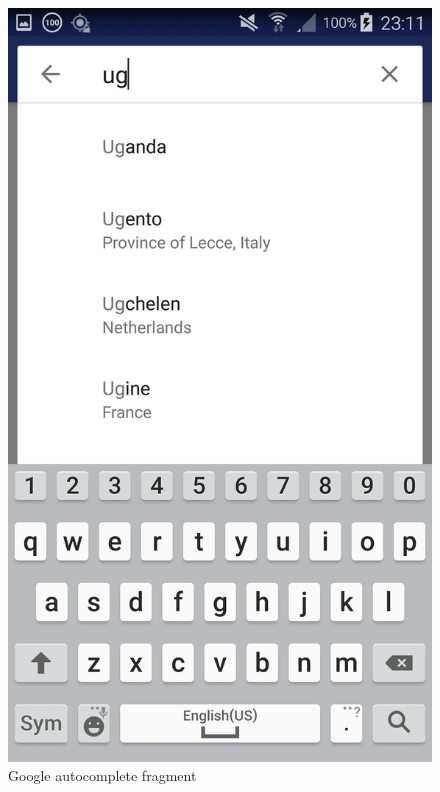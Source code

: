\documentclass[11pt,a4paper]{article}
\begin{document}
\begin{figure}[htb]
	\centerline{\includegraphics[width=1.0\textwidth]{GUI/autocomplete.jpg}}
	\caption{Google autocomplete fragment}
	\label{sl:koncept}
\end{figure}
\end{document}
